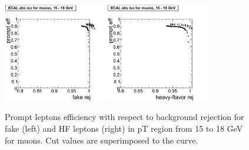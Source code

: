 \begin{figure}[htbp]
\begin{center}
 \includegraphics[width = 0.4\textwidth]{pictures/trackCut/bkgdRej_sigEff/muon_fake_ptCut4_ptCut5.png}
\includegraphics[width = 0.4\textwidth]{pictures/trackCut/bkgdRej_sigEff/muon_nonPrompt_ptCut4_ptCut5.png}
\caption{\small{Prompt leptons efficiency with respect to background 
rejection for fake (left) and HF leptons (right) in pT region
from 15 to 18 GeV for muons. 
Cut values are superimposed to the curve.}\label{fig:ecalrej_mu5}}
\end{center}
\end{figure}

